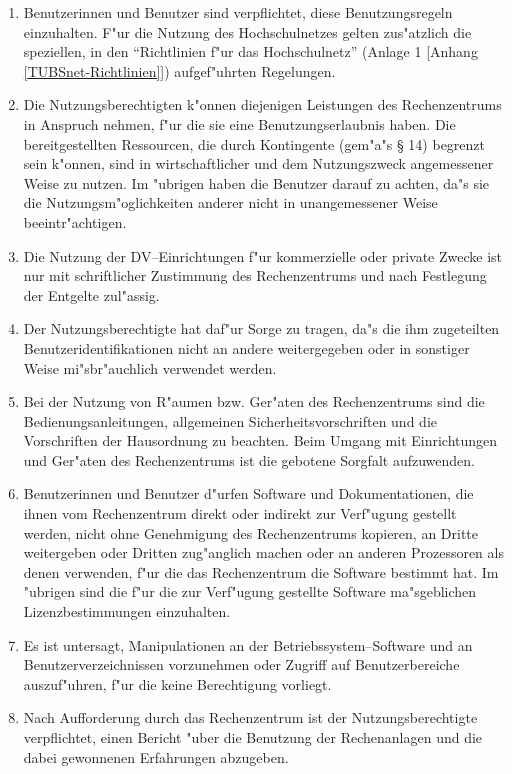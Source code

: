 \begin{enumerate}
  \item Benutzerinnen und Benutzer sind verpflichtet, diese Benutzungsregeln
    einzuhalten. F"ur die Nutzung des Hochschulnetzes gelten
    zus"atzlich die speziellen, in den "`Richtlinien f"ur das
    Hochschulnetz"' (Anlage 1 [Anhang \ref{TUBSnet-Richtlinien}])
    aufgef"uhrten Regelungen.

  \item Die Nutzungsberechtigten k"onnen diejenigen Leistungen des
    Rechenzentrums in Anspruch nehmen, f"ur die sie eine
    Benutzungserlaubnis haben. Die bereitgestellten Ressourcen, die durch
    Kontingente (gem"a"s \S{} 14) begrenzt sein k"onnen, sind in
    wirtschaftlicher und dem Nutzungszweck angemessener Weise zu nutzen.
    Im "ubrigen haben die Benutzer darauf zu achten, da"s sie
    die Nutzungsm"oglichkeiten anderer nicht in unangemessener Weise
    beeintr"achtigen.

  \item Die Nutzung der DV--Einrichtungen f"ur kommerzielle oder private
    Zwecke ist nur mit schriftlicher Zustimmung des Rechenzentrums und
    nach Festlegung der Entgelte zul"assig.

  \item Der Nutzungsberechtigte hat daf"ur Sorge zu tragen, da"s die
    ihm zugeteilten Benutzeridentifikationen nicht an andere weitergegeben
    oder in sonstiger Weise mi"sbr"auchlich verwendet werden.

  \item Bei der Nutzung von R"aumen bzw. Ger"aten des Rechenzentrums
    sind die Bedienungsanleitungen, allgemeinen Sicherheitsvorschriften
    und die Vorschriften der Hausordnung zu beachten. Beim Umgang mit
    Einrichtungen und Ger"aten des Rechenzentrums ist die gebotene
    Sorgfalt aufzuwenden.

  \item Benutzerinnen und Benutzer d"urfen Software und Dokumentationen,
    die ihnen vom Rechenzentrum direkt oder indirekt zur Verf"ugung
    gestellt werden, nicht ohne Genehmigung des Rechenzentrums kopieren,
    an Dritte weitergeben oder Dritten zug"anglich machen oder an
    anderen Prozessoren als denen verwenden, f"ur die das Rechenzentrum
    die Software bestimmt hat. Im "ubrigen sind die f"ur die
    zur Verf"ugung gestellte Software ma"sgeblichen
    Lizenzbestimmungen einzuhalten.

  \item Es ist untersagt, Manipulationen an der Betriebssystem--Software
    und an Benutzerverzeichnissen vorzunehmen oder Zugriff auf
    Benutzerbereiche auszuf"uhren, f"ur die keine Berechtigung
    vorliegt.

  \item Nach Aufforderung durch das Rechenzentrum ist der Nutzungsberechtigte
    verpflichtet, einen Bericht "uber die Benutzung der Rechenanlagen
    und die dabei gewonnenen Erfahrungen abzugeben.
\end{enumerate}

